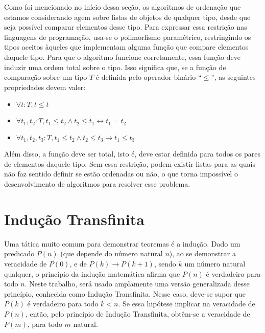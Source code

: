 \documentclass[12pt, oneside, a4paper,english,brazil]{abntex2}
\begin{document}
\qquad Como foi mencionado no in\'icio dessa se\c{c}\~ao, os algoritmos de ordena\c{c}\~ao que estamos
considerando agem sobre listas de objetos de qualquer tipo, desde que seja poss\'ivel comparar elementos
desse tipo. Para expressar essa restri\c{c}\~ao nas linguagens de programa\c{c}\~ao, usa-se o polimorfismo
param\'etrico, restringindo os tipos aceitos \`aqueles que implementam alguma fun\c{c}\~ao que compare
elementos daquele tipo. Para que o algoritmo funcione corretamente, essa fun\c{c}\~ao deve induzir uma ordem
total sobre o tipo. Isso significa que, se a fun\c{c}\~ao de compara\c{c}\~ao sobre um tipo $T$ \'e definida
pelo operador bin\'ario ``$\le$'', as seguintes propriedades devem valer:

\begin{itemize}
  \item $\forall t : T, t \le t$
  \item $\forall t_{1}, t_{2} : T, t_{1} \le t_{2} \wedge t_{2} \le t_{1} \leftrightarrow t_{1} = t_{2}$
  \item $\forall t_{1}, t_{2}, t_{3} : T, t_{1} \le t_{2} \wedge t_{2} \le t_{3} \rightarrow t_{1} \le t_{3}$
\end{itemize}

\qquad Al\'em disso, a fun\c{c}\~ao deve ser total, isto \'e, deve estar definida para todos os pares de
elementos daquele tipo. Sem essa restri\c{c}\~ao, podem existir listas para as quais n\~ao faz sentido
definir se est\~ao ordenadas ou n\~ao, o que torna imposs\'ivel o desenvolvimento de algoritmos para resolver
esse problema.

\section{Indu\c{c}\~ao Transfinita}

\qquad Uma t\'atica muito comum para demonstrar teoremas \'e a indu\c{c}\~ao. Dado um predicado $P(n)$ (que
depende do n\'umero natural $n$), ao se demonstrar a veracidade de $P(0)$, e de $P(k) \rightarrow P(k + 1)$,
sendo $k$ um n\'umero natural qualquer, o princ\'ipio da indu\c{c}\~ao matem\'atica afirma que $P(n)$ \'e
verdadeiro para todo $n$. Neste trabalho, ser\'a usado amplamente uma vers\~ao generalizada desse
princ\'ipio, conhecida como Indu\c{c}\~ao Transfinita. Nesse caso, deve-se supor que $P(k)$ \'e verdadeiro
para todo $k < n$. Se essa hip\'otese implicar na veracidade de $P(n)$, ent\~ao, pelo princ\'ipio de
Indu\c{c}\~ao Transfinita, obt\^em-se a veracidade de $P(m)$, para todo $m$ natural.
\end{document}
